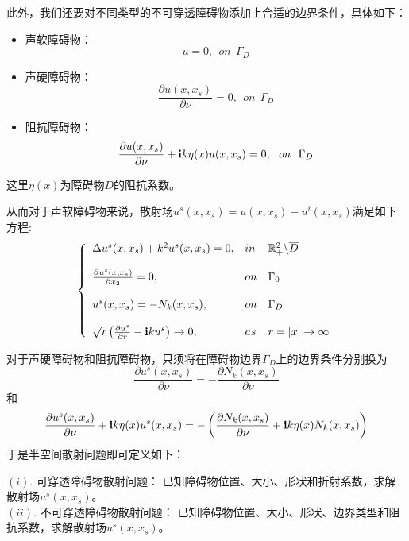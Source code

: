 此外，我们还要对不同类型的不可穿透障碍物添加上合适的边界条件，具体如下：
\begin{itemize}
  \item 声软障碍物：
  \begin{equation}
     u=0,\ \ on\ \ \Gamma_D
  \end{equation}
  \item 声硬障碍物：
  \begin{equation}
    \frac{\partial u(x,x_s)}{\partial\nu}=0,\ \ on\ \ \Gamma_D
  \end{equation}
  \item 阻抗障碍物：
  \begin{equation}
    \frac{\partial u(x,x_s)}{\partial\nu}+\i k\eta(x)u(x,x_s)=0,\ \ on\ \ \Gamma_D
  \end{equation}
\end{itemize}
 这里$\eta(x)$为障碍物$D$的阻抗系数。

从而对于声软障碍物来说，散射场$u^s(x,x_s)=u(x,x_s)-u^i(x,x_s)$满足如下方程:
\begin{eqnarray}
\left\{
\begin{array}{lll}
 \Delta u^s(x,x_s)+k^2u^s(x,x_s)=0,&in&\mathbb{R}^2_+\backslash\overline{D}  \\
 & &\\
 \frac{\partial u^s(x,x_s)}{\partial x_2}=0,&on&\Gamma_0  \\
 & &\\
 u^s(x,x_s)=-N_k(x,x_s),& on&\Gamma_D\\
 & &\\
 \sqrt{r}\left(\frac{\partial u^s}{\partial r}-\mathbf{i} k u^s\right)\rightarrow0,&as&r=|x|\rightarrow\infty
\end{array}
\right.
\end{eqnarray}

对于声硬障碍物和阻抗障碍物，只须将在障碍物边界$\Gamma_D$上的边界条件分别换为
\begin{equation}
  \frac{\partial u^s(x,x_s)}{\partial\nu}=-\frac{\partial N_k(x,x_s)}{\partial\nu}
\end{equation}
和
\begin{equation}
  \frac{\partial u^s(x,x_s)}{\partial\nu}+\mathbf{i} k\eta(x)u^s(x,x_s)=-\left(\frac{\partial N_k(x,x_s)}{\partial\nu}+\mathbf{i} k\eta(x)N_k(x,x_s)\right)
\end{equation}
于是半空间散射问题即可定义如下：
\begin{question}[半空间散射问题]
$(i).$ 可穿透障碍物散射问题：
    已知障碍物位置、大小、形状和折射系数，求解散射场$u^s(x,x_s)$。\\
$(ii).$ 不可穿透障碍物散射问题：
    已知障碍物位置、大小、形状、边界类型和阻抗系数，求解散射场$u^s(x,x_s)$。
\end{question}

